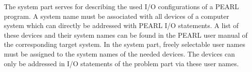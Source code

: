 The system part serves for describing the used I/O configurations of a
PEARL program. A system name must be associated with all devices of a
computer system which can directly be addressed with PEARL I/O
statements. A list of these devices and their system names can be
found in the PEARL user manual of the corresponding target system. In
the system part, freely selectable user names must be assigned to the
system names of the needed devices. The devices can only be addressed in
I/O statements of the problem part via these user names. 
